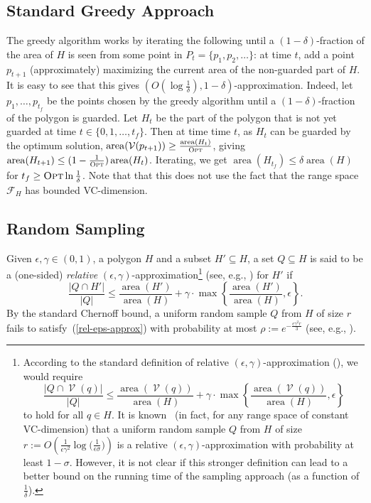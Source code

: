 \documentclass[a4paper,11pt]{article}
\def\cF{\mathcal F}
\def\cV{\mathcal V}
\newcommand{\raf}[1]{(\ref{#1})}
\newcommand{\area}{\operatorname{area}}
\newcommand{\Vis}{\operatorname{\cV}}
\def \OPT {\textsc{Opt}}
\begin{document}
\subsection{Standard Greedy Approach}\label{greedy}

The greedy algorithm works by iterating the following until a $(1-\delta)$-fraction of the area of $H$ is seen from some point in $P_t=\{p_1,p_2,\ldots\}$: at time $t$, add a point $p_{t+1}$ (approximately) maximizing the current area of the non-guarded part of $H$. It is easy to see that this gives $(O(\log\frac1\delta),1-\delta)$-approximation.
Indeed, let $p_1,\ldots,p_{t_f}$ be the points chosen by the greedy algorithm until a $(1-\delta)$-fraction of the polygon is guarded. Let $H_t$ be the part of the polygon that is not yet guarded at time $t\in\{0,1,\ldots,t_f\}$. Then at time time $t$, as $H_t$ can be guarded by the optimum solution, $\area(\Vis(p_{t+1}))\ge\frac{\area(H_t)}{\OPT}$, giving $\area(H_{t+1})\le(1-\frac1{\OPT})\area(H_{t})$. Iterating, we get $\area(H_{t_f})\le \delta \area(H)$ for $t_f\ge \OPT\ln\frac1\delta$. Note that that this does not use the fact that the range space $\cF_H$ has bounded VC-dimension.
\iffalse
\subsection{Random Sampling}\label{rand-samp}

Given $\epsilon,\gamma\in(0,1)$, a polygon $H$ and a subset $H'\subseteq H$, a set $Q\subseteq H$ is said to be a (one-sided) {\it relative} $(\epsilon,\gamma)$-approximation\footnote{According to the standard definition of relative $(\epsilon,\gamma)$-approximation (\cite{AS08,C00,CM22,HS11,LLS01,VC71}), we would require
	\begin{equation}\label{rel-eps-approx-0}
	\frac{|Q\cap \Vis(q)|}{ |Q|}\le\frac{\area(\Vis(q))}{\area(H)}+\gamma\cdot\max\left\{\frac{\area(\Vis(q))}{\area(H)},\epsilon\right\}
	\end{equation}
	to hold for all $q\in H$. It is known~\cite{LLS01} (in fact, for any range space of constant VC-dimension) that a uniform random sample $Q$ from $H$ of size $r:=O\left(\frac{1}{\epsilon\gamma^2}\log\big(\frac1{\epsilon\sigma}\big)\right)$ is a relative $(\epsilon,\gamma)$-approximation with probability at least $1-\sigma$. However, it is not clear if this stronger definition can lead to a better bound on the running time of the sampling approach (as a function of $\frac1\delta$).
} (see, e.g., \cite{CM22,HS11,LLS01}) for $H'$ if 
\begin{equation}\label{rel-eps-approx}
\frac{|Q\cap H'|}{ |Q|}\le\frac{\area(H')}{\area(H)}+\gamma\cdot\max\left\{\frac{\area(H')}{\area(H)},\epsilon\right\}.
\end{equation}
By the standard Chernoff bound, a uniform random sample $Q$ from $H$ of size $r$ fails to satisfy~\raf{rel-eps-approx} with probability at most $\rho:=e^{-\frac{\epsilon \gamma^2r}{3}}$ (see, e.g., \cite{CM22}).
\end{document}
